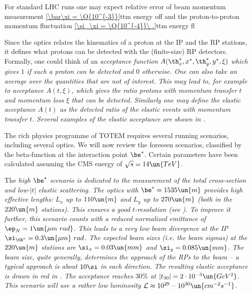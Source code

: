 For standard LHC runs one may expect relative error of beam momentum measurement
\eqref{\bar\xi = \O{10^{-3}}}{ttm energy off}
and the proton-to-proton momentum fluctuation
\eqref{\si_\xi = \O{10^{-4}}\ .}{ttm energy fl}

Since the optics  relates the kinematics of a proton at the IP and the RP stations, it defines what protons can be detected with the (finite-size) RP detectors. Formally, one could think of an \em{acceptance} function $A(\th_x^*, x^*, \th_y^*, y^*, \xi)$ which gives $1$ if such a proton can be detected and $0$ otherwise. One can also take an average over the quantities that are not of interest. This may lead to, for example to acceptance $A(t, \xi)$, which gives the ratio protons with momentum transfer $t$ and momentum loss $\xi$ that can be detected. Similarly one may define the \em{elastic acceptance} $A(t)$ as the detected ratio of the elastic events with momentum transfer $t$. Several examples of the elastic acceptance are shown in .



The rich physics programme of TOTEM requires several running scenarios, including several optics. We will now review the foreseen scenarios, classified by the beta-function at the interaction point $\be^*$. Certain parameters have been calculated assuming the CMS energy of $\sqrt s = 14\un{TeV}$.

\> The \em{high $\be^*$} scenario is dedicated to the measurement of the total cross-section and low-$|t|$ elastic scattering. The optics with $\be^* = 1535\un{m}$ provides high effective lengths: $L_x$ up to $110\un{m}$ and $L_y$ up to $270\un{m}$ (both in the $220\un{m}$ stations). This ensures a good $t$-resolution (see ). To improve it further, this scenario counts with a reduced normalized emittance of $\ep_N=1\un{\mu m\ rad}$. This leads to a very low beam divergence at the IP $\si_{\th^*} = 0.3\un{\mu m}\ rad$. The expected beam sizes (i.e. the beam sigmas) at the $220\un{m}$ stations are $\si_x = 0.03\un{mm}$ and $\si_y = 0.085\un{mm}$. The beam size, quite generally, determines the approach of the RPs to the beam -- a typical approach is about $10\si$ in each direction. The resulting elastic acceptance is drawn in red in . The acceptance reaches $30\percent$ at $|t_{30}| = 2\cdot10^{-3}\un{GeV^2}$. This scenario will use a rather low luminosity ${\cal L} \approx 10^{29} \hbox{ -- } 10^{30}\un{cm^{-2}s^{-1}}$.

